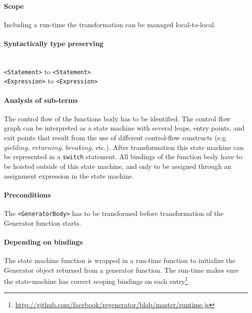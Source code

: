 \paragraph{Scope}
Including a run-time the transformation can be managed local-to-local.

\paragraph{Syntactically type preserving} \mbox{}\\
\lstinline$<Statement>$ to \lstinline$<Statement>$ \\
\lstinline$<Expression>$ to \lstinline$<Expression>$

\paragraph{Analysis of sub-terms}
The control flow of the functions body has to be identified. The control flow graph can be interpreted as a state machine with several leaps, entry points, and exit points that result from the use of different control-flow constructs (e.g. $yielding$, $returning$, $breaking$, etc.). After transformation this state machine can be represented in a \lstinline$switch$ statement. All bindings of the function body have to be hoisted outside of this state machine, and only to be assigned through an assignment expression in the state machine. 

\paragraph{Preconditions}
The \lstinline$<GeneratorBody>$ has to be transformed before transformation of the Generator function starts.

\paragraph{Depending on bindings}
The state machine function is wrapped in a run-time function to initialize the Generator object returned from a generator function. The run-time makes sure the state-machine has correct scoping bindings on each entry\footnote{\url{http://github.com/facebook/regenerator/blob/master/runtime.js}}

